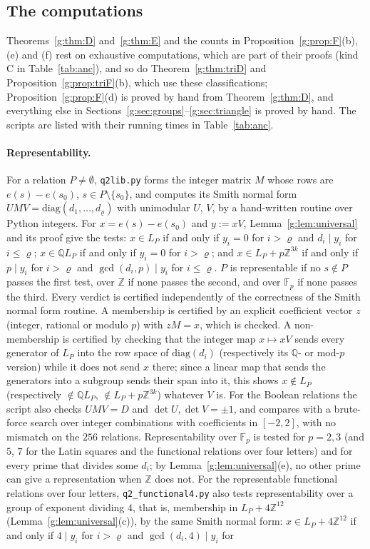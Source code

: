 \documentclass[11pt]{article}
\theoremstyle{definition}
\theoremstyle{remark}
\newcommand{\Z}{\mathbb{Z}}
\newcommand{\Fp}{\mathbb{F}_p}
\newcommand{\Q}{\mathbb{Q}}
\begin{document}
\subsection{The computations}\label{g:sec:computer}

Theorems~\ref{g:thm:D} and~\ref{g:thm:E} and the counts in Proposition~\ref{g:prop:F}(b), (e) and (f) rest on exhaustive computations, which are part of their proofs (kind C in Table~\ref{tab:anc}), and so do Theorem~\ref{g:thm:triD} and Proposition~\ref{g:prop:triF}(b), which use these classifications; Proposition~\ref{g:prop:F}(d) is proved by hand from Theorem~\ref{g:thm:D}, and everything else in Sections~\ref{g:sec:groups}--\ref{g:sec:triangle} is proved by hand. The scripts are listed with their running times in Table~\ref{tab:anc}.

\paragraph{Representability.} For a relation $P\ne\emptyset$, \texttt{q2lib.py} forms the integer matrix $M$ whose rows are $e(s)-e(s_0)$, $s\in P\setminus\{s_0\}$, and computes its Smith normal form $UMV=\mathrm{diag}(d_1,\dots,d_\varrho)$ with unimodular $U$, $V$, by a hand-written routine over Python integers. For $x=e(s)-e(s_0)$ and $y:=xV$, Lemma~\ref{g:lem:universal} and its proof give the tests: $x\in L_P$ if and only if $y_i=0$ for $i>\varrho$ and $d_i\mid y_i$ for $i\le\varrho$; $x\in\Q L_P$ if and only if $y_i=0$ for $i>\varrho$; and $x\in L_P+p\Z^{3k}$ if and only if $p\mid y_i$ for $i>\varrho$ and $\gcd(d_i,p)\mid y_i$ for $i\le\varrho$. $P$ is representable if no $s\notin P$ passes the first test, over $\Z$ if none passes the second, and over $\Fp$ if none passes the third. Every verdict is certified independently of the correctness of the Smith normal form routine. A membership is certified by an explicit coefficient vector $z$ (integer, rational or modulo $p$) with $zM=x$, which is checked. A non-membership is certified by checking that the integer map $x\mapsto xV$ sends every generator of $L_P$ into the row space of $\mathrm{diag}(d_i)$ (respectively its $\Q$- or mod-$p$ version) while it does not send $x$ there; since a linear map that sends the generators into a subgroup sends their span into it, this shows $x\notin L_P$ (respectively $\notin\Q L_P$, $\notin L_P+p\Z^{3k}$) whatever $V$ is. For the Boolean relations the script also checks $UMV=D$ and $\det U,\det V=\pm1$, and compares with a brute-force search over integer combinations with coefficients in $[-2,2]$, with no mismatch on the $256$ relations. Representability over $\Fp$ is tested for $p=2,3$ (and $5$, $7$ for the Latin squares and the functional relations over four letters) and for every prime that divides some $d_i$; by Lemma~\ref{g:lem:universal}(e), no other prime can give a representation when $\Z$ does not. For the representable functional relations over four letters, \texttt{q2\_functional4.py} also tests representability over a group of exponent dividing $4$, that is, membership in $L_P+4\Z^{12}$ (Lemma~\ref{g:lem:universal}(c)), by the same Smith normal form: $x\in L_P+4\Z^{12}$ if and only if $4\mid y_i$ for $i>\varrho$ and $\gcd(d_i,4)\mid y_i$ for 
\end{document}
